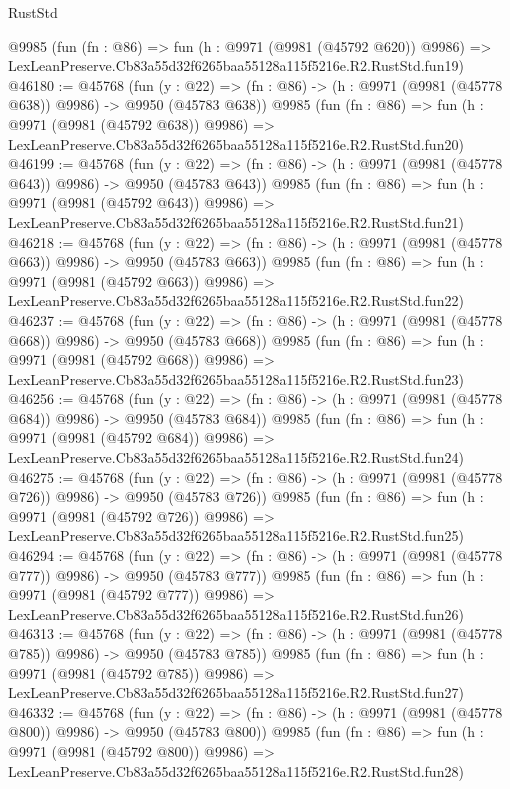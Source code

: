 \begin{lexlean}{RustStd}
\begin{coremodule}
    @9985
    (fun (fn : @86) =>
    fun (h : @9971 (@9981 (@45792 @620)) @9986) =>
    LexLeanPreserve.Cb83a55d32f6265baa55128a115f5216e.R2.RustStd.fun19)
@46180 := @45768
    (fun (y : @22) => (fn : @86) -> (h : @9971 (@9981 (@45778 @638)) @9986) -> @9950 (@45783 @638))
    @9985
    (fun (fn : @86) =>
    fun (h : @9971 (@9981 (@45792 @638)) @9986) =>
    LexLeanPreserve.Cb83a55d32f6265baa55128a115f5216e.R2.RustStd.fun20)
@46199 := @45768
    (fun (y : @22) => (fn : @86) -> (h : @9971 (@9981 (@45778 @643)) @9986) -> @9950 (@45783 @643))
    @9985
    (fun (fn : @86) =>
    fun (h : @9971 (@9981 (@45792 @643)) @9986) =>
    LexLeanPreserve.Cb83a55d32f6265baa55128a115f5216e.R2.RustStd.fun21)
@46218 := @45768
    (fun (y : @22) => (fn : @86) -> (h : @9971 (@9981 (@45778 @663)) @9986) -> @9950 (@45783 @663))
    @9985
    (fun (fn : @86) =>
    fun (h : @9971 (@9981 (@45792 @663)) @9986) =>
    LexLeanPreserve.Cb83a55d32f6265baa55128a115f5216e.R2.RustStd.fun22)
@46237 := @45768
    (fun (y : @22) => (fn : @86) -> (h : @9971 (@9981 (@45778 @668)) @9986) -> @9950 (@45783 @668))
    @9985
    (fun (fn : @86) =>
    fun (h : @9971 (@9981 (@45792 @668)) @9986) =>
    LexLeanPreserve.Cb83a55d32f6265baa55128a115f5216e.R2.RustStd.fun23)
@46256 := @45768
    (fun (y : @22) => (fn : @86) -> (h : @9971 (@9981 (@45778 @684)) @9986) -> @9950 (@45783 @684))
    @9985
    (fun (fn : @86) =>
    fun (h : @9971 (@9981 (@45792 @684)) @9986) =>
    LexLeanPreserve.Cb83a55d32f6265baa55128a115f5216e.R2.RustStd.fun24)
@46275 := @45768
    (fun (y : @22) => (fn : @86) -> (h : @9971 (@9981 (@45778 @726)) @9986) -> @9950 (@45783 @726))
    @9985
    (fun (fn : @86) =>
    fun (h : @9971 (@9981 (@45792 @726)) @9986) =>
    LexLeanPreserve.Cb83a55d32f6265baa55128a115f5216e.R2.RustStd.fun25)
@46294 := @45768
    (fun (y : @22) => (fn : @86) -> (h : @9971 (@9981 (@45778 @777)) @9986) -> @9950 (@45783 @777))
    @9985
    (fun (fn : @86) =>
    fun (h : @9971 (@9981 (@45792 @777)) @9986) =>
    LexLeanPreserve.Cb83a55d32f6265baa55128a115f5216e.R2.RustStd.fun26)
@46313 := @45768
    (fun (y : @22) => (fn : @86) -> (h : @9971 (@9981 (@45778 @785)) @9986) -> @9950 (@45783 @785))
    @9985
    (fun (fn : @86) =>
    fun (h : @9971 (@9981 (@45792 @785)) @9986) =>
    LexLeanPreserve.Cb83a55d32f6265baa55128a115f5216e.R2.RustStd.fun27)
@46332 := @45768
    (fun (y : @22) => (fn : @86) -> (h : @9971 (@9981 (@45778 @800)) @9986) -> @9950 (@45783 @800))
    @9985
    (fun (fn : @86) =>
    fun (h : @9971 (@9981 (@45792 @800)) @9986) =>
    LexLeanPreserve.Cb83a55d32f6265baa55128a115f5216e.R2.RustStd.fun28)

\end{coremodule}
\end{lexlean}
